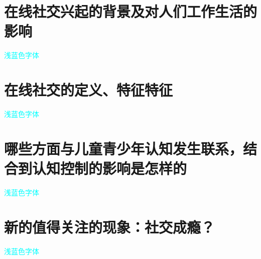 \section{ 在线社交兴起的背景及对人们工作生活的影响 }
\textcolor{cyan}{浅蓝色字体}


\section{在线社交的定义、特征特征  }
\textcolor{cyan}{浅蓝色字体}


\section{哪些方面与儿童青少年认知发生联系，结合到认知控制的影响是怎样的  }
\textcolor{cyan}{浅蓝色字体}

\section{新的值得关注的现象：社交成瘾？   }

\textcolor{cyan}{浅蓝色字体}